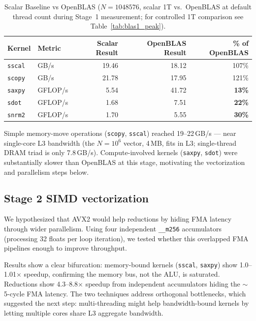 \documentclass[11pt,a4paper]{article}
\begin{document}
\begin{table}[h]
\centering
\caption{Scalar Baseline vs OpenBLAS ($N = 1048576$, scalar 1T vs.\ OpenBLAS at default thread count during Stage~1 measurement; for controlled 1T comparison see Table~\ref{tab:blas1_peak}).}
\small
\begin{tabular}{llrrr}
\toprule
Kernel & Metric & Scalar Result & OpenBLAS Result & \% of OpenBLAS \\
\midrule
\texttt{sscal} & GB/s & 19.46 & 18.12 & 107\% \\
\texttt{scopy} & GB/s & 21.78 & 17.95 & 121\% \\
\texttt{saxpy} & GFLOP/s & 5.54 & 41.72 & \textbf{13\%} \\
\texttt{sdot} & GFLOP/s & 1.68 & 7.51 & \textbf{22\%} \\
\texttt{snrm2} & GFLOP/s & 1.70 & 5.55 & \textbf{30\%} \\
\bottomrule
\end{tabular}
\end{table}

Simple memory-move operations (\texttt{scopy}, \texttt{sscal}) reached 19--22\,GB/s — near single-core L3 bandwidth (the $N=10^6$ vector, 4\,MB, fits in L3; single-thread DRAM triad is only 7.8\,GB/s). Compute-involved kernels (\texttt{saxpy}, \texttt{sdot}) were substantially slower than OpenBLAS at this stage, motivating the vectorization and parallelism steps below.

\subsection*{Stage 2 SIMD vectorization}
We hypothesized that AVX2 would help reductions by hiding FMA latency through wider parallelism. Using four independent \texttt{\_\_m256} accumulators (processing 32 floats per loop iteration), we tested whether this overlapped FMA pipelines enough to improve throughput.

Results show a clear bifurcation: memory-bound kernels (\texttt{sscal}, \texttt{saxpy}) show 1.0--1.01$\times$ speedup, confirming the memory bus, not the ALU, is saturated. Reductions show 4.3--8.8$\times$ speedup from independent accumulators hiding the $\sim$5-cycle FMA latency. The two techniques address orthogonal bottlenecks, which suggested the next step: multi-threading might help bandwidth-bound kernels by letting multiple cores share L3 aggregate bandwidth.
\end{document}
